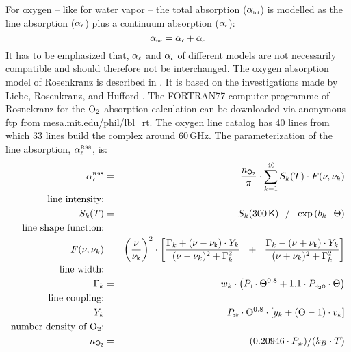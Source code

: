 For oxygen -- like for water vapor -- the total absorption 
($\alpha_{\mbox{\tiny \sf tot}}$) is modelled as the line absorption ($\alpha_{\mbox{\tiny $\ell$}}$) plus a  
continuum absorption ($\alpha_{\mbox{\tiny \sf c}}$):
\begin{equation}
  \label{eq:o2:totabs}
  \alpha_{\mbox{\tiny \sf tot}} = \alpha_{\mbox{\tiny $\ell$}} + \alpha_{\mbox{\tiny \sf c}}
\end{equation}
It has to be emphasized that, $\alpha_{\mbox{\tiny $\ell$}}$ and $\alpha_{\mbox{\tiny \sf c}}$ of different
models are not necessarily compatible and should therefore not be interchanged.
%
%
%
%
\label{leveld:02_pwr98}
%
\label{levele:02_pwr98_line}
The oxygen absorption model of Rosenkranz is described in \cite{pwr:93}. It 
is based on the investigations made by Liebe, Rosenkranz, and Hufford 
\cite{liebeetal:92}. The FORTRAN77 computer programme of Rosnekranz for 
the $\mbox{O}_2$ absorption calculation can be downloaded via anonymous ftp from 
mesa.mit.edu/phil/lbl\_rt.
%
\label{levele:o2_r93_lines}
The oxygen line catalog has 40 lines from which 33 lines build the 
complex around 60\,GHz. The parameterization of the line absorption,
$\alpha^{\mbox{\tiny \rm R98}}_{\mbox{\tiny $\ell$}}$, is:
\begin{eqnarray}
  \alphapwrl & = & \frac{n_{\sf O_2}}{\pi} \cdot 
                   \sum_{k=1}^{40}{S_k(T) \cdot F(\nu,\nu_k)}\\
%
%
 \mbox{line intensity:} & & \nonumber\\
      S_k(T) & = & S_k(300\,{\sf K})~~/~~\exp{(b_k \cdot \Theta)}\nonumber\\
 \mbox{line shape function:} & & \nonumber\\
F(\nu,\nu_k) & = & \left(\frac{\nu}{\nuk}\right)^2 \cdot 
                   \left[\frac{\Gamma_k+(\nu-\nuk)\cdot Y_k}
                              {(\nu-\nu_k)^2+\Gamma_k^2}~~+~~
                         \frac{\Gamma_k-(\nu+\nuk)\cdot Y_k}
                              {(\nu+\nu_k)^2+\Gamma_k^2}\right] \nonumber\\
 \mbox{line width:} & & \nonumber\\
    \Gamma_k & = & w_k \cdot \left(          \pda  \cdot \Theta^{0.8} + 
                                   1.1 \cdot \phzo \cdot \Theta \right) \nonumber\\
 \mbox{line coupling:} & & \nonumber\\
         Y_k & = & \pdair \cdot \Theta^{0.8} \cdot 
                   \left[ y_k + (\Theta-1) \cdot v_k \right]\nonumber\\
 \mbox{number density of $\oz$:} & & \nonumber\\
           n_{\sf O_2} & = & (0.20946 \cdot \pdair)/(k_B \cdot T)\nonumber\\
           \nonumber
\end{eqnarray}
